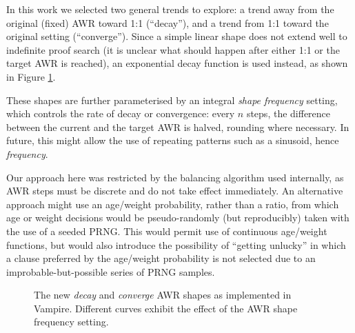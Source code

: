 \documentclass{llncs}
\begin{document}
In this work we selected two general trends to explore: a trend away from the original (fixed) AWR toward 1:1 (``decay''), and a trend from 1:1 toward the original setting (``converge'').
Since a simple linear shape does not extend well to indefinite proof search (it is unclear what should happen after either 1:1 or the target AWR is reached), an exponential decay function is used instead, as shown in Figure \ref{fig:decay-and-converge}.


These shapes are further parameterised by an integral \emph{shape frequency} setting, which controls the rate of decay or convergence: every \(n\) steps, the difference between the current and the target AWR is halved, rounding where necessary.
In future, this might allow the use of repeating patterns such as a sinusoid, hence \emph{frequency}.


Our approach here was restricted by the balancing algorithm used internally, as AWR steps must be discrete and do not take effect immediately.
An alternative approach might use an age/weight probability, rather than a ratio, from which age or weight decisions would be pseudo-randomly (but reproducibly) taken with the use of a seeded PRNG.
This would permit use of continuous age/weight functions, but would also introduce the possibility of ``getting unlucky'' in which a clause preferred by the age/weight probability is not selected due to an improbable-but-possible series of PRNG samples.

\begin{figure}
	\caption{The new \emph{decay} and \emph{converge} AWR shapes as implemented in Vampire. Different curves exhibit the effect of the AWR shape frequency setting.}
	\label{fig:decay-and-converge}
\end{figure}
\end{document}
